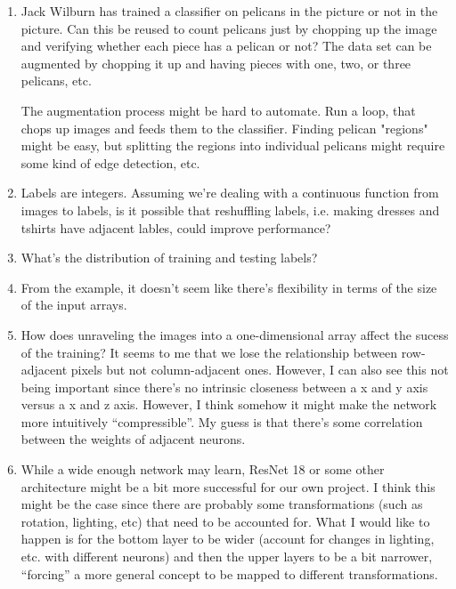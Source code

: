 \begin{enumerate} 
	\item  Jack Wilburn has trained a classifier on pelicans in the picture
	or not in the picture. Can this be reused to count pelicans just by
	chopping up the image and verifying whether each piece has a pelican or
	not? The data set can be augmented by chopping it up and having pieces
	with one, two, or three pelicans, etc.

	The augmentation process might be hard to automate. Run a loop, that chops up
	images and feeds them to the classifier. Finding pelican "regions"
	might be easy, but splitting the regions into individual pelicans might
	require some kind of edge detection, etc.

	\item  Labels are integers. Assuming we're dealing with a continuous
	function from images to labels, is it possible that reshuffling labels,
	i.e. making dresses and tshirts have adjacent lables, could improve
	performance?

	\item What's the distribution of training and testing labels?

	\item From the example, it doesn't seem like there's flexibility in
	terms of the size of the input arrays.

	\item How does unraveling the images into a one-dimensional array
	affect the sucess of the training? It seems to me that we lose the
	relationship between row-adjacent pixels but not column-adjacent
	ones. However, I can also see this not being important since there's
	no intrinsic closeness between a x and y axis versus a x and z axis.
	However, I think somehow it might make the network more intuitively
	``compressible''. My guess is that there's some correlation between the
	weights of adjacent neurons.

	\item While a wide enough network may learn, ResNet 18 or some other
	architecture might be a bit more successful for our own project. I
	think this might be the case since there are probably some
	transformations (such as rotation, lighting, etc) that need to be
	accounted for. What I would like to happen is for the bottom layer to
	be wider (account for changes in lighting, etc. with different neurons)
	and then the upper layers to be a bit narrower, ``forcing'' a more
	general concept to be mapped to different transformations.


\end{enumerate}
